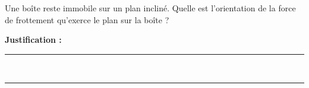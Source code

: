 Une boîte reste immobile sur un plan incliné. Quelle est l'orientation de la force de frottement qu'exerce le plan sur la boîte ?

\choices

\noindent\textbf{Justification :} \hrulefill \\[2.5ex]
\rule{\linewidth}{0.4pt} \\[2.5ex]
\rule{\linewidth}{0.4pt}
\vfill
